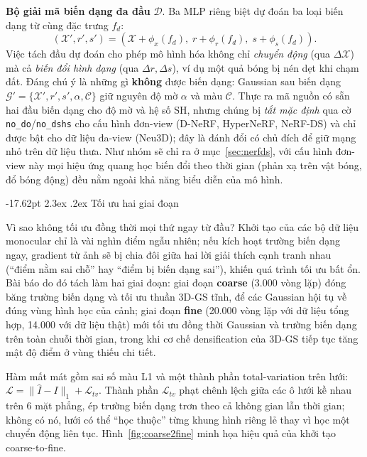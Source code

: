\documentclass[a4paper]{report}
\makeatletter
\renewcommand\section{\@startsection{section}{1}{\z@}%
    {-17.62pt \@plus -5.89pt \@minus -1.18pt}%
    {2.3ex \@plus .2ex}%
    {\normalfont\fontsize{14.95pt}{16.31pt}\selectfont\bfseries}}
\makeatother
\begin{document}
\textbf{Bộ giải mã biến dạng đa đầu} $\mathcal{D}$. Ba MLP riêng biệt dự đoán ba
loại biến dạng từ cùng đặc trưng $f_d$:
\begin{equation}
    (\mathcal{X}', r', s') = (\mathcal{X} + \phi_x(f_d),\; r + \phi_r(f_d),\; s + \phi_s(f_d)).
\end{equation}
Việc tách đầu dự đoán cho phép mô hình hóa không chỉ \textit{chuyển động} (qua
$\Delta\mathcal{X}$) mà cả \textit{biến đổi hình dạng} (qua $\Delta r, \Delta s$),
ví dụ một quả bóng bị nén dẹt khi chạm đất. Đáng chú ý là những gì
\textbf{không} được biến dạng: Gaussian sau biến dạng
$\mathcal{G}'=\{\mathcal{X}', r', s', \alpha, \mathcal{C}\}$ giữ nguyên độ mờ
$\alpha$ và màu $\mathcal{C}$. Thực ra mã nguồn có sẵn hai đầu biến dạng cho độ mờ và hệ số
SH, nhưng chúng bị \textit{tắt mặc định} qua cờ \texttt{no\_do}/\texttt{no\_dshs} cho cấu hình
đơn-view (D-NeRF, HyperNeRF, NeRF-DS) và chỉ được bật cho dữ liệu đa-view (Neu3D); đây là
đánh đổi có chủ đích để giữ mạng nhỏ trên dữ liệu thưa. Như nhóm sẽ chỉ ra ở
mục~\ref{sec:nerfds}, với cấu hình đơn-view này mọi hiệu ứng quang học biến đổi theo thời gian
(phản xạ trên vật bóng, đổ bóng động) đều nằm ngoài khả năng biểu diễn của mô hình.

\section{Tối ưu hai giai đoạn}

Vì sao không tối ưu đồng thời mọi thứ ngay từ đầu? Khởi tạo của các bộ dữ liệu
monocular chỉ là vài nghìn điểm ngẫu nhiên; nếu kích hoạt trường biến dạng ngay,
gradient từ ảnh sẽ bị chia đôi giữa hai lời giải thích cạnh tranh nhau (``điểm
nằm sai chỗ'' hay ``điểm bị biến dạng sai''), khiến quá trình tối ưu bất ổn. Bài
báo do đó tách làm hai giai đoạn: giai đoạn \textbf{coarse} (3.000 vòng lặp)
đóng băng trường biến dạng và tối ưu thuần 3D-GS tĩnh, để các Gaussian hội tụ về
đúng vùng hình học của cảnh; giai đoạn \textbf{fine} (20.000 vòng lặp với dữ
liệu tổng hợp, 14.000 với dữ liệu thật) mới tối ưu đồng thời Gaussian và trường
biến dạng trên toàn chuỗi thời gian, trong khi cơ chế densification của 3D-GS
tiếp tục tăng mật độ điểm ở vùng thiếu chi tiết.

Hàm mất mát gồm sai số màu L1 và một thành phần total-variation trên lưới:
$\mathcal{L} = \|\hat{I} - I\|_1 + \mathcal{L}_{tv}$. Thành phần
$\mathcal{L}_{tv}$ phạt chênh lệch giữa các ô lưới kề nhau trên 6 mặt phẳng, ép
trường biến dạng trơn theo cả không gian lẫn thời gian; không có nó, lưới có thể
``học thuộc'' từng khung hình riêng lẻ thay vì học một chuyển động liên tục.
Hình~\ref{fig:coarse2fine} minh họa hiệu quả của khởi tạo coarse-to-fine.
\end{document}

